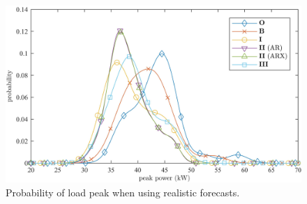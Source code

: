 \begin{figure}\centering
	\includegraphics{_chapter2/fig/pdf-1-avg}
	\caption{Probability of load peak when using realistic forecasts.}
	\label{ch2:fig:peak-pdf}
\end{figure}